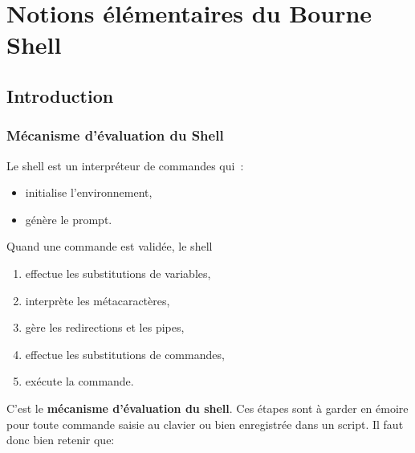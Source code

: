 %
%
\setcounter{remarque-cnt}{1}
\setcounter{example-cnt}{1}
\chapter{Notions {\'e}l{\'e}mentaires du Bourne Shell}
\thispagestyle{fancy}

\section{Introduction}
\subsection{M{\'e}canisme d'{\'e}valuation du Shell}
Le shell est un interpr{\'e}teur de commandes qui~:
\begin{itemize}
	\item initialise l'environnement,
	\item g{\'e}n{\`e}re le prompt.
\end{itemize}

Quand une commande est valid{\'e}e, le shell
\begin{enumerate}
	\item  effectue les substitutions de variables,
	\item interpr{\`e}te les m{\'e}tacaract{\`e}res,
	\item g{\`e}re les redirections et les pipes,
	\item effectue les substitutions de commandes,
	\item ex{\'e}cute la commande.
\end{enumerate}
C'est le \textbf{m{\'e}canisme d'{\'e}valuation du shell}. Ces
{\'e}tapes sont {\`a} garder en {\'e}moire pour toute commande saisie au
clavier ou bien enregistr{\'e}e dans un script. Il faut donc bien retenir que:

